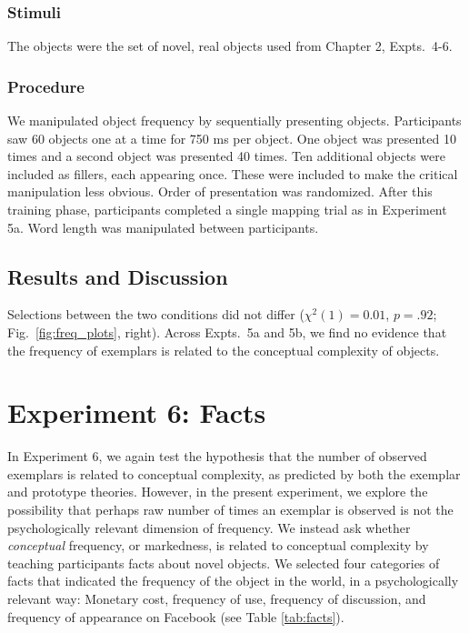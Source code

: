 \subsubsection{Stimuli} 

The objects were the set of novel, real objects used from Chapter 2, Expts.\ 4-6. 

\subsubsection{Procedure}
We manipulated object frequency by sequentially presenting objects. Participants saw 60 objects one at a time for 750 ms per object. One object was presented 10 times and a second object was presented 40 times. Ten additional objects were included as fillers, each appearing once. These were included to make the critical manipulation less obvious. Order of presentation was randomized. After this training phase, participants completed a single mapping trial as in Experiment 5a. Word length was manipulated between participants.

\subsection{Results and Discussion}
Selections between the two conditions did not differ (${\chi}^2$$(1) = 0.01$, $p = .92$; Fig.\ \ref{fig:freq_plots}, right). Across Expts.\ 5a and 5b, we find no evidence that the frequency of exemplars is related to the conceptual complexity of objects.

\section{Experiment 6: Facts}
In Experiment 6, we again test the hypothesis that the number of observed exemplars is related to conceptual complexity, as predicted by both the exemplar and prototype theories. However, in the present experiment, we explore the possibility that perhaps raw number of times an exemplar is observed is not the psychologically relevant dimension of frequency. We instead ask whether {\it conceptual} frequency, or markedness, is related to conceptual complexity by teaching participants facts about novel objects. We selected four categories of facts  that indicated the frequency of the object in the world, in a psychologically relevant way: Monetary cost, frequency of use, frequency of discussion, and frequency of appearance on Facebook (see Table \ref{tab:facts}).

